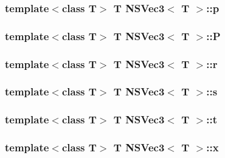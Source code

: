 \hypertarget{structNSVec3_a8d244562d8e23e387b9e8102dfd3a14d}{
\subsubsection[{p}]{\setlength{\rightskip}{0pt plus 5cm}template$<$class T$>$ T {\bf N\-S\-Vec3}$<$ T $>$\-::p}}\label{structNSVec3_a8d244562d8e23e387b9e8102dfd3a14d}
\hypertarget{structNSVec3_ad4f0cefc81041963c730f9d60093442e}{
\subsubsection[{P}]{\setlength{\rightskip}{0pt plus 5cm}template$<$class T$>$ T {\bf N\-S\-Vec3}$<$ T $>$\-::P}}\label{structNSVec3_ad4f0cefc81041963c730f9d60093442e}
\hypertarget{structNSVec3_a7d4a1f0856df05844ec136f59033e32a}{
\subsubsection[{r}]{\setlength{\rightskip}{0pt plus 5cm}template$<$class T$>$ T {\bf N\-S\-Vec3}$<$ T $>$\-::r}}\label{structNSVec3_a7d4a1f0856df05844ec136f59033e32a}
\hypertarget{structNSVec3_a5f429613450844e0b8a8fbb502ee6342}{
\subsubsection[{s}]{\setlength{\rightskip}{0pt plus 5cm}template$<$class T$>$ T {\bf N\-S\-Vec3}$<$ T $>$\-::s}}\label{structNSVec3_a5f429613450844e0b8a8fbb502ee6342}
\hypertarget{structNSVec3_a3df97592d42f0f53d8b48fbb5c95b506}{
\subsubsection[{t}]{\setlength{\rightskip}{0pt plus 5cm}template$<$class T$>$ T {\bf N\-S\-Vec3}$<$ T $>$\-::t}}\label{structNSVec3_a3df97592d42f0f53d8b48fbb5c95b506}
\hypertarget{structNSVec3_abc4e7ffce298313829ad938a5af61818}{
\subsubsection[{x}]{\setlength{\rightskip}{0pt plus 5cm}template$<$class T$>$ T {\bf N\-S\-Vec3}$<$ T $>$\-::x}}\label{structNSVec3_abc4e7ffce298313829ad938a5af61818}
